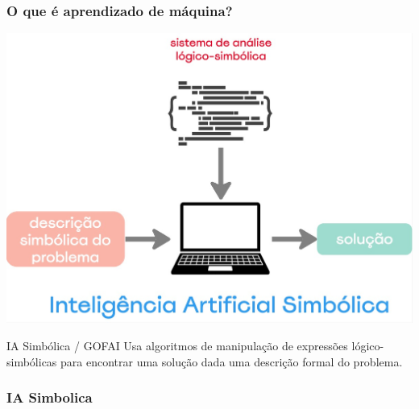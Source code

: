 \begin{frame}
    \frametitle{O que é aprendizado de máquina?}
    \begin{center}
        \includegraphics[height=0.4\paperheight]{./imgs/fig4-ai-simbolica.jpg}
    \end{center}
    \begin{block}{IA Simbólica / GOFAI}
        Usa algoritmos de manipulação de expressões lógico-simbólicas para encontrar uma solução dada uma descrição formal do problema.
    \end{block}
\end{frame}

\subsubsection{IA Simbolica}

